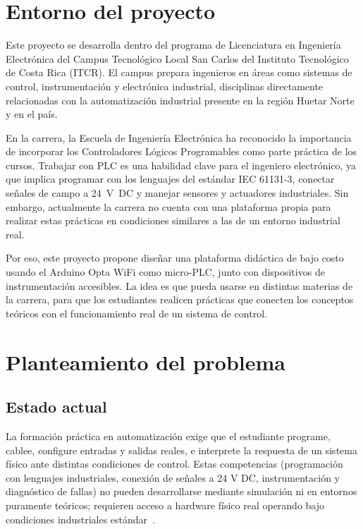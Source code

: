 \documentclass[12pt,a4paper,oneside]{report}
\begin{document}
\section{Entorno del proyecto}
\label{sec:entorno}

Este proyecto se desarrolla dentro del programa de Licenciatura en Ingeniería Electrónica del Campus Tecnológico Local San Carlos del Instituto Tecnológico de Costa Rica (ITCR). El campus prepara ingenieros en áreas como sistemas de control, instrumentación y electrónica industrial, disciplinas directamente relacionadas con la automatización industrial presente en la región Huetar Norte y en el país.

En la carrera, la Escuela de Ingeniería Electrónica ha reconocido la importancia de incorporar los Controladores Lógicos Programables como parte práctica de los cursos. Trabajar con PLC es una habilidad clave para el ingeniero electrónico, ya que implica programar con los lenguajes del estándar IEC 61131-3, conectar señales de campo a 24~V~DC y manejar sensores y actuadores industriales. Sin embargo, actualmente la carrera no cuenta con una plataforma propia para realizar estas prácticas en condiciones similares a las de un entorno industrial real.

Por eso, este proyecto propone diseñar una plataforma didáctica de bajo costo usando el Arduino Opta WiFi como micro-PLC, junto con dispositivos de instrumentación accesibles. La idea es que pueda usarse en distintas materias de la carrera, para que los estudiantes realicen prácticas que conecten los conceptos teóricos con el funcionamiento real de un sistema de control.

\section{Planteamiento del problema}
\label{sec:problema}

\subsection{Estado actual}

La formación práctica en automatización exige que el estudiante programe, cablee, configure entradas y salidas reales, e interprete la respuesta de un sistema físico ante distintas condiciones de control. Estas competencias (programación con lenguajes industriales, conexión de señales a 24 V DC, instrumentación y diagnóstico de fallas) no pueden desarrollarse mediante simulación ni en entornos puramente teóricos; requieren acceso a hardware físico real operando bajo condiciones industriales estándar~\cite{ref3,ref4}.
\end{document}
